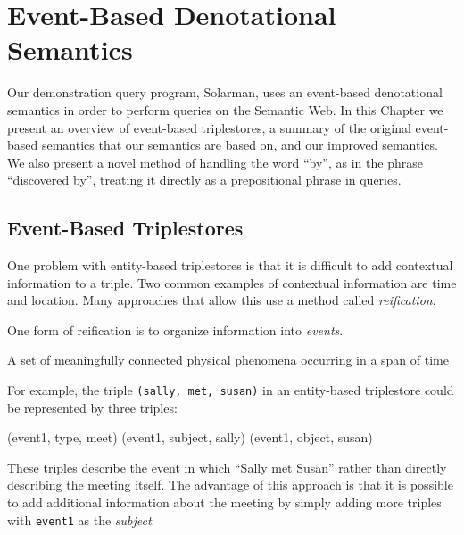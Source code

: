 \documentclass[../main.tex]{subfiles}
\begin{document}
	
\setlength{\abovedisplayskip}{0pt}
\setlength{\belowdisplayskip}{12pt}
\setlength{\abovedisplayshortskip}{0pt}
\setlength{\belowdisplayshortskip}{0pt} 

\chapter {Event-Based Denotational Semantics}

\label{chapter:semantics}

Our demonstration query program, Solarman, uses an event-based denotational semantics in order to perform queries on the Semantic Web.  In this Chapter we present
an overview of event-based triplestores, a summary of the original event-based semantics that our semantics are based on, and our improved semantics.
We also present a novel method of handling the word ``by'', as in the phrase ``discovered by'', treating it directly as a prepositional phrase in queries.

\section{Event-Based Triplestores}

One problem with entity-based triplestores is that it is difficult to add contextual information to a triple.  Two common examples of contextual information are time and location.  Many approaches that allow this use a method called {\em reification}\cite{antoniou2004semantic}. %

One form of reification is to organize information into {\em events}.

\begin{definition}[Event]
	A set of meaningfully connected physical phenomena occurring in a span of time
\end{definition}

For example, the triple \texttt{(sally, met, susan)} in an entity-based triplestore could be represented by three triples:

\begin{code}
	(event1, type, meet)
	(event1, subject, sally)
	(event1, object, susan)
\end{code}

These triples describe the event in which ``Sally met Susan'' rather than directly describing the meeting itself.  The advantage of this approach is that it is possible to add additional information about the meeting by simply adding more triples with \texttt{event1} as the {\em subject}:
\end{document}
